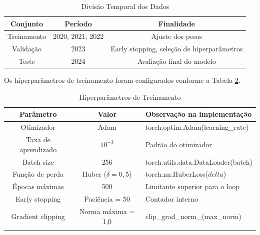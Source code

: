 \begin{table}[H]
    \centering
    \renewcommand{\arraystretch}{1.5}
    \begin{tabular}{|c|c|c|}
        \hline
        \textbf{Conjunto} & \textbf{Período} & \textbf{Finalidade} \\
        \hline
        Treinamento & 2020, 2021, 2022 & Ajuste dos pesos \\
        Validação & 2023 & Early stopping, seleção de hiperparâmetros \\
        Teste & 2024 & Avaliação final do modelo \\
        \hline
    \end{tabular}
    \caption{Divisão Temporal dos Dados}
    \label{tab:divisao_temporal}
\end{table}

Os hiperparâmetros de treinamento foram configurados conforme a Tabela \ref{tab:hiperparametros}.

\begin{table}[H]
    \centering
    \renewcommand{\arraystretch}{1.5}
    \begin{tabularx}{\textwidth}{|c|c|X|}
        \hline
        \textbf{Parâmetro} & \textbf{Valor} & \textbf{Observação na implementação} \\
        \hline
        Otimizador & Adam & torch.optim.Adam(learning\_rate) \\
        Taxa de aprendizado & \(10^{-3}\) & Padrão do otimizador \\
        Batch size & 256 & torch.utils.data.DataLoader(batch) \\
        Função de perda & Huber (\(\delta = 0,5\)) & torch.nn.HuberLoss(\(delta\)) \\
        Épocas máximas & 500 & Limitante superior para o loop \\
        Early stopping & Paciência = 50 & Contador interno \\
        Gradient clipping & Norma máxima = 1,0 & clip\_grad\_norm\_(max\_norm) \\
        \hline
        \caption{Hiperparâmetros de Treinamento}\label{tab:hiperparametros}
    \end{tabularx}
\end{table}